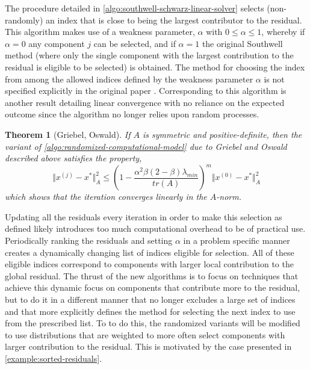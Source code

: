 \documentclass{article}
\newtheorem{theorem}{Theorem}
\theoremstyle{definition}
\theoremstyle{example}
\theoremstyle{example}
\theoremstyle{example}
\begin{document}
The procedure detailed in \cref{algo:southwell-schwarz-linear-solver} selects (non-randomly) an index that is close to being the largest contributor to the residual. This algorithm makes use of a weakness parameter, $\alpha$ with $0 \leq \alpha \leq 1$, whereby if $\alpha = 0$ any component $j$ can be selected, and if $\alpha = 1$ the original Southwell method (where only the single component with the largest contribution to the residual is eligible to be selected) is obtained. The method for choosing the index from among the allowed indices defined by the weakness parameter $\alpha$ is not specified explicitly in the original paper \cite{griebel2012greedy}. Corresponding to this algorithm is another result detailing linear convergence with no reliance on the expected outcome since the algorithm no longer relies upon random processes.

\begin{theorem}[Griebel, Oswald]
\label{th:southwell-schwarz}
	If $A$ is symmetric and positive-definite, then the variant of \cref{algo:randomized-computational-model} due to Griebel and Oswald described above satisfies the property,
	\begin{equation}
	\Vert x^{(j)} - x^* \Vert_A^2 \leq \left(1 - \frac{\alpha^2 \beta (2 - \beta)\lambda_{min}}{tr(A)}\right)^m \Vert x^{(0)} - x^* \Vert_A^2
	\end{equation}
	which shows that the iteration converges linearly in the $A$-norm.
\end{theorem}

Updating all the residuals every iteration in order to make this selection as defined likely introduces too much computational overhead to be of practical use. Periodically ranking the residuals and setting $\alpha$ in a problem specific manner creates a dynamically changing list of indices eligible for selection. All of these eligible indices correspond to components with larger local contribution to the global residual. The thrust of the new algorithms is to focus on techniques that achieve this dynamic focus on components that contribute more to the residual, but to do it in a different manner that no longer excludes a large set of indices and that more explicitly defines the method for selecting the next index to use from the prescribed list. To to do this, the randomized variants will be modified to use distributions that are weighted to more often select components with larger contribution to the residual. This is motivated by the case presented in \cref{example:sorted-residuals}.
\end{document}
